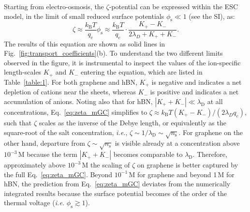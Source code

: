 \documentclass[journal=ancac3,manuscript=article,layout=twocolumn]{achemso}
\newcommand{\kt}{k_\text{B}T}
\newcommand{\phis}{\phi_\text{s}}
\newcommand{\ns}{n_\text{s}}
\begin{document}
Starting from electro-osmosis, the $\zeta$-potential
can be expressed within the ESC model, in the limit of small reduced surface potentials $\phis \ll 1$ (see the SI), as:
\begin{equation}
\label{eq:zeta_mGC}
     \zeta \approx \frac{\kt}{q_e} \phis \approx \frac{\kt}{q_e} \cdot \frac{   K_+ - K_- }{  2\lambda_D + K_+ + K_- }.
\end{equation}
The results of this equation are shown as solid lines in
Fig.~\ref{fig:transport_coefficients}(b).
To understand the two different limits observed in
the figure, it is instrumental to inspect
the values of the ion-specific length-scales
$K_+$ and $K_-$ entering the equation, which are
listed in Table~\ref{table:1}.
For both graphene and hBN, $K_+$ is negative
and indicates a net depletion of cations near the sheets,
whereas $K_-$ is positive and indicates a net accumulation
of anions. Noting also that for hBN,
$|K_+ + K_-| \ll \lambda_\mathrm D$ at all
concentrations,  Eq.~\eqref{eq:zeta_mGC}
simplifies to $\zeta \approx \kt (K_+ - K_-)/(2\lambda_D q_e)$, such that
$\zeta$ scales as the inverse of the Debye length, or equivalently
as  the square-root of the salt concentration, \textit{i.e.}, $\zeta \sim 1/\lambda_\mathrm D \sim \sqrt{\ns}$.
For graphene on the other hand,
departure from $\zeta\sim\sqrt{\ns}$ is visible
already at a concentration above $10^{-3}$\,M
because the term $|K_++K_-|$ becomes comparable to $\lambda_\mathrm D$.
Therefore, approximately above
$10^{-3}$\,M the scaling of $\zeta$ on graphene is better
captured by the full Eq.~\eqref{eq:zeta_mGC}.
Beyond $10^{-1}$\,M for graphene and beyond 1\,M for hBN,
the prediction from Eq.~\eqref{eq:zeta_mGC} deviates
from the numerically integrated results
because the surface potential
becomes of the order of the thermal voltage
(\textit{i.e.} $\phis \gtrsim 1$).
\end{document}

